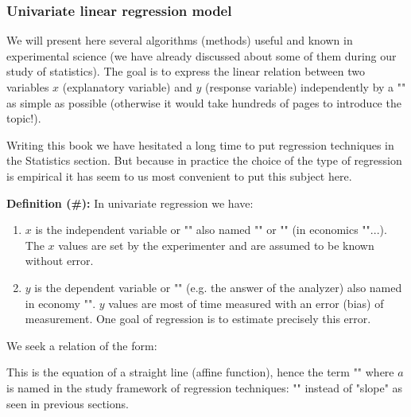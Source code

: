 	\pagebreak
	\subsubsection{Univariate linear regression model}\label{simple linear regression}
	
	We will present here several algorithms (methods) useful and known in experimental science (we have already discussed about some of them during our study of statistics). The goal is to express the linear relation between two variables $x$ (explanatory variable) and $y$ (response variable) independently by a "" as simple as possible (otherwise it would take hundreds of pages to introduce the topic!).
	
	\begin{tcolorbox}[title=Remark,colframe=black,arc=10pt]
	Writing this book we have hesitated a long time to put regression techniques in the Statistics section. But because in practice the choice of the type of regression is empirical it has seem to us most convenient to put this subject here.
	\end{tcolorbox}	
	
	\textbf{Definition (\#\mydef):} In univariate regression we have:
	\begin{enumerate}
		\item $x$ is the independent variable or "" also named "" or "" (in economics ""...). The $x$ values are set by the experimenter and are assumed to be known without error.
		
		\item $y$ is the dependent variable or "" (e.g. the answer of the analyzer) also named in economy "". $y$ values are most of time measured with an error (bias) of measurement. One goal of regression is to estimate precisely this error.
	\end{enumerate}
	We seek a relation of the form:
	
	This is the equation of a straight line (affine function), hence the term "" where $a$ is named in the study framework of regression techniques: "" instead of "slope" as seen in previous sections.
	
